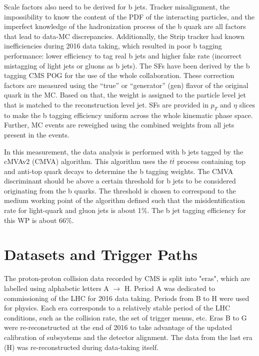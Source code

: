 Scale factors also need to be derived for b jets. Tracker misalignment, the impossibility to know the content of the PDF of the interacting particles, and the imperfect knowledge of the hadronization process of the b quark are all factors that lead to data-MC discrepancies. Additionally, the Strip tracker had known inefficiencies during 2016 data taking, which resulted in poor b tagging performance: lower efficiency to tag real b jets and higher fake rate (incorrect mistagging of light jets or gluons as b jets). The SFs have been derived by the b tagging CMS POG for the use of the whole collaboration. These correction factors are measured using the ``true'' or ``generator'' (gen) flavor of the original quark in the MC. Based on that, the weight is assigned to the particle level jet that is matched to the reconstruction level jet. SFs are provided in $p_T$ and $\eta$ slices to make the b tagging efficiency uniform across the whole kinematic phase space. Further, MC events are reweighed using the combined weights from all jets present in the events. 

In this measurement, the data analysis is performed with b jets tagged by the cMVAv2 (CMVA) algorithm. This algorithm uses the $t\bar{t}$ process containing top and anti-top quark decays to determine the b tagging weights. The CMVA discriminant should be above a certain threshold for b jets to be considered originating from the b quarks. The threshold is chosen to correspond to the medium working point of the algorithm defined such that the misidentification rate for light-quark and gluon jets is about 1$\%$.  The b jet tagging efficiency for this WP is about 66$\%$.


\section{Datasets and Trigger Paths}\label{sec:data_and_trigger}

The proton-proton collision data recorded by CMS is split into "eras", which are labelled using alphabetic letters A $\rightarrow $ H. Period A was dedicated to commissioning of the LHC for 2016 data taking. Periods from B to H were used for physics. Each era corresponds to a relatively stable period of the LHC conditions, such as the collision rate, the set of trigger menus, etc. Eras B to G were re-reconstructed at the end of 2016 to take advantage of the updated calibration of subsystems and the detector alignment. The data from the last era (H) was re-reconstructed during data-taking itself. 

